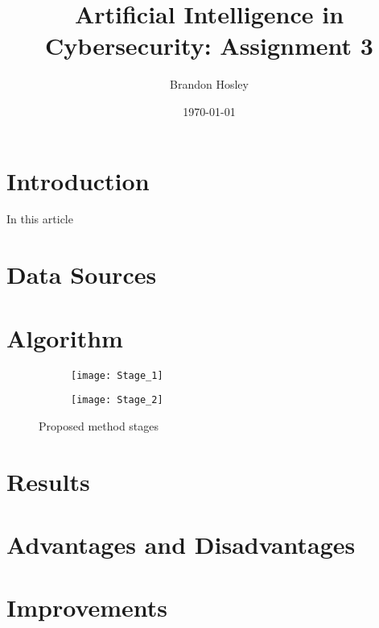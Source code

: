 \documentclass[]{article}
\title{Artificial Intelligence in Cybersecurity: Assignment 3}
\author{Brandon Hosley}
\date{\today}
\begin{document}
	\maketitle
	
\section{Introduction}

In this article \cite{} 

\section{Data Sources}



\section{Algorithm}



\begin{figure}[h]
	\centering
	\begin{subfigure}{0.48\linewidth}
		\texttt{[image: Stage\_1]}
	\end{subfigure}
	\hfill
	\begin{subfigure}{0.48\linewidth}
		\texttt{[image: Stage\_2]}
	\end{subfigure}
	\caption{Proposed method stages \cite{Zhao2020}}
\end{figure}


\section{Results}



\section{Advantages and Disadvantages}





\section{Improvements}



\clearpage


\end{document}
